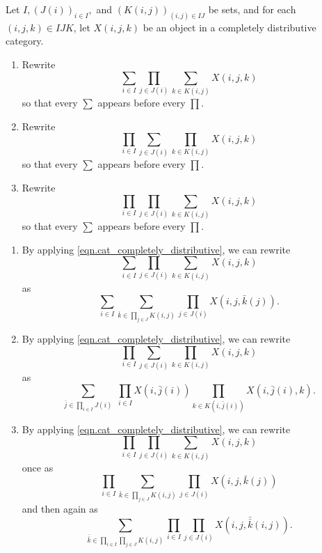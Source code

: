 \documentclass[Book-Poly]{subfiles}
\begin{document}
\begin{exercise} \label{exc.push_prod_sum_set}
    Let $I, (J(i))_{i\in I},$ and $(K(i,j))_{(i,j)\in IJ}$ be sets, and for each $(i,j,k)\in IJK$, let $X(i,j,k)$ be an object in a completely distributive category.
    \begin{enumerate}
        \item Rewrite
        \[
        \sum_{i\in I}\prod_{j\in J(i)}\sum_{k\in K(i,j)}X(i,j,k)
        \]
        so that every $\sum$ appears before every $\prod$.
        \item Rewrite
        \[
        \prod_{i\in I}\sum_{j\in J(i)}\prod_{k\in K(i,j)}X(i,j,k)
        \]
        so that every $\sum$ appears before every $\prod$.
        \item Rewrite
        \[
        \prod_{i\in I}\prod_{j\in J(i)}\sum_{k\in K(i,j)}X(i,j,k)
        \]
        so that every $\sum$ appears before every $\prod$.\qedhere
    \end{enumerate}
    \begin{solution}
        \begin{enumerate}
            \item By applying \eqref{eqn.cat_completely_distributive}, we can rewrite
            \[
            \sum_{i\in I}\prod_{j\in J(i)}\sum_{k\in K(i,j)}X(i,j,k)
            \]
            as
            \[
            \sum_{i\in I}\sum_{\bar{k}\in \prod_{j\in J}K(i,j)}\prod_{j\in J(i)}X(i,j,\bar{k}(j)).
            \]
            \item By applying \eqref{eqn.cat_completely_distributive}, we can rewrite
            \[
            \prod_{i\in I}\sum_{j\in J(i)}\prod_{k\in K(i,j)}X(i,j,k)
            \]
            as
            \[
            \sum_{\bar{j}\in \prod_{i\in I}J(i)}\;\prod_{i\in I}X(i,\bar{j}(i))\prod_{k\in K(i,\bar{j}(i))}X(i,\bar{j}(i),k).
            \]
            \item By applying \eqref{eqn.cat_completely_distributive}, we can rewrite
            \[
            \prod_{i\in I}\prod_{j\in J(i)}\sum_{k\in K(i,j)}X(i,j,k)
            \]
            once as
            \[
            \prod_{i\in I}\sum_{\bar{k}\in\prod_{j\in J}K(i,j)}\prod_{j\in J(i)}X(i,j,\bar{k}(j))
            \]
            and then again as
            \[
            \sum_{\bar{\bar{k}}\in\prod_{i\in I}\prod_{j\in J}K(i,j)}\prod_{i\in I}\prod_{j\in J(i)}X(i,j,\bar{\bar{k}}(i,j)).
            \]
        \end{enumerate}
    \end{solution}
\end{exercise}
\end{document}
